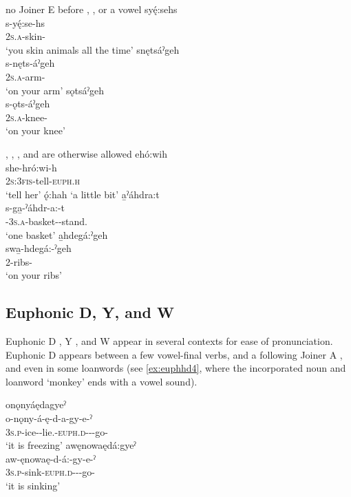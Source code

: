 \ea\label{ex:epenvex9} no Joiner E before , , or a vowel
\ea syę́:sehs\\
\gll s-yę́:se-hs\\
 \textsc{2s.a}-skin-{\habitual}\\
\glt `you skin animals all the time'
\ex snętsáˀgeh\\
\gll s-nęts-áˀgeh\\
 \textsc{2s.a}-arm-{\on}\\
\glt `on your arm'
\ex sǫtsáˀgeh\\
\gll s-ǫts-áˀgeh\\
 \textsc{2s.a}-knee-{\on}\\
\glt `on your knee'
\z
\z

\ea\label{ex:epenvex10} , , , and  are otherwise allowed
\ea {}ehó:wih\\
\gll she-hró:wi-h\\
\textsc{2s:3fis}-tell-\textsc{euph.h}\\
\glt `tell her'
\ex {}ǫ́:hah ‘a little bit’ 
\ex {}a̱ˀáhdra:t\\
\gll s-ga̱-ˀáhdr-a:-t\\
 {\repetitive}-\textsc{3s.a}-basket-{\joinerA}-stand.{\stative}\\
\glt `one basket'
\ex {}a̱hdegá:ˀgeh\\
\gll swa̱-hdegá:-ˀgeh\\
 {2\pla}-ribs-{\on}\\
\glt `on your ribs'
\z
\z

\subsection{Euphonic D, Y, and W} \label{Euphonic D, Y, and W}
Euphonic D , Y , and W  appear in several contexts for ease of pronunciation. Euphonic D appears between a few vowel-final verbs, and a following Joiner A , and even in some loanwords (see \ref{ex:euphhd4}, where the incorporated noun and loanword ‘monkey’ ends with a vowel sound).

\ea\label{ex:euphhd2}
\ea onǫnyáędagyeˀ\\
\gll o-nǫny-á-ę-d-a-gy-e-ˀ\\
\textsc{3s.p}-ice-{\joinerA}-lie.{\stative}-\textsc{euph.d}-{\joinerA}-{\progressive}-go-{\stative}\\
\glt `it is freezing'
\ex awęnowaędá:gyeˀ\\
\gll aw-ęnowaę-d-á:-gy-e-ˀ\\
\textsc{3s.p}-sink-\textsc{euph.d}-{\joinerA}-{\progressive}-go-{\stative}\\
\glt `it is sinking'
\z
\z

